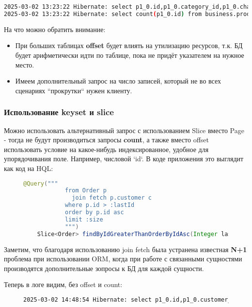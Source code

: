 \begin{lstlisting}[language=bash, frame=single, basicstyle=\normalsize\ttfamily, breaklines=true,label={lst:hiberpagelog}]
2025-03-02 13:23:22 Hibernate: select p1_0.id,p1_0.category_id,p1_0.characteristics,p1_0.description,p1_0.name,p1_0.price from business.product p1_0 offset ? rows fetch first ? rows only
2025-03-02 13:23:22 Hibernate: select count(p1_0.id) from business.product p1_0
\end{lstlisting}

На что можно обратить внимание:
\begin{itemize}
    \item При больших таблицах \textbf{offset} будет влиять на утилизацию ресурсов, т.к. БД будет арифметически
    идти по таблице, пока не придёт указателем на нужное место.
    \item Имеем дополнительный запрос на число записей, который не во всех сценариях ``прокрутки`` нужен клиенту.
\end{itemize}

\subsubsection{Использование keyset и slice}\label{subsubsec:slicekeysetpagination}
Можно использовать альтернативный запрос с использованием Slice вместо Page - тогда не будут производиться запросы
\textbf{count}, а также вместо offset использовать условие на какое-нибудь индексированное, удобное для упорядочивания
поле.
Например, числовой `id`.
В коде приложения это выглядит как код на HQL:
\begin{figure}[H]
\begin{lstlisting}[language=java, frame=single, keepspaces=true, showstringspaces=false, basicstyle=\normalsize\ttfamily, breaklines=true,label={lst:hqlquery}]
    @Query("""
            from Order p
              join fetch p.customer c
            where p.id > :lastId
            order by p.id asc
            limit :size
            """)
    Slice<Order> findByIdGreaterThanOrderByIdAsc(Integer lastId, int size);
\end{lstlisting}\label{fig:hqlkeyfetchlisting}
\end{figure}
Заметим, что благодаря использованию join fetch была устранена известная \textbf{N+1} проблема при использовании ORM,
когда при работе с связанными сущностями производятся дополнительные зопросы к БД для каждой сущности.

Теперь в логе видим, без offset и count:
\begin{figure}[H]
\begin{lstlisting}[language=bash, frame=single, basicstyle=\normalsize\ttfamily, breaklines=true,label={lst:hiberpagelog}]
2025-03-02 14:48:54 Hibernate: select p1_0.id,p1_0.customer_id,c1_0.id,c1_0.bonus_points,c1_0.email,c1_0.loyalty_status,c1_0.name,c1_0.phone,p1_0.order_date,p1_0.shop_id,p1_0.total_amount from business.order p1_0 join business.customer c1_0 on c1_0.id=p1_0.customer_id where p1_0.id>? order by p1_0.id fetch first ? rows only
\end{lstlisting}\label{fig:hibernooffsetlisting}
\end{figure}

